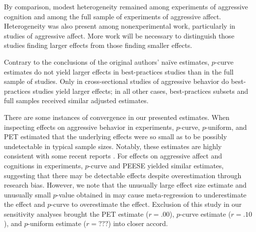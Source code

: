 \documentclass[man, mask]{apa6}
\begin{document}
By comparison, modest heterogeneity remained among experiments of aggressive cognition and among the full sample of experiments of aggressive affect. Heterogeneity was also present among nonexperimental work, particularly in studies of aggressive affect. More work will be necessary to distinguish those studies finding larger effects from those finding smaller effects.

Contrary to the conclusions of the original authors' na{\"i}ve estimates, $p$-curve estimates do not yield larger effects in best-practices studies than in the full sample of studies. Only in cross-sectional studies of aggressive behavior do best-practices studies yield larger effects; in all other cases, best-practices subsets and full samples received similar adjusted estimates. 

There are some instances of convergence in our presented estimates. When inspecting effects on aggressive behavior in experiments, $p$-curve, $p$-uniform, and PET estimated that the underlying effects were so small as to be possibly undetectable in typical sample sizes. Notably, these estimates are highly consistent with some recent reports \citep{Engelhardt:etal:2015,Kneer:etal:inpress,Tear:Nielsen:2014,Przybylski:etal:2014}. For effects on aggressive affect and cognitions in experiments, $p$-curve and PEESE yielded similar estimates, suggesting that there may be detectable effects despite overestimation through research bias. However, we note that the unusually large effect size estimate and unusually small $p$-value obtained in \citet{Ballard:Wiest:1996} may cause meta-regression to underestimate the effect and $p$-curve to overestimate the effect. Exclusion of this study in our sensitivity analyses brought the PET estimate ($r = .00$), $p$-curve estimate ($r = .10$), and $p$-uniform estimate ($r = ???$) into closer accord.



\end{document}
